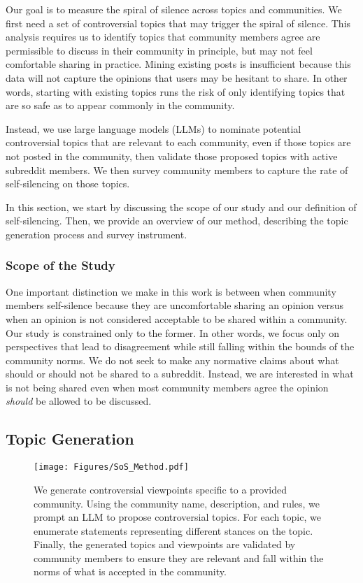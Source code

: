 Our goal is to measure the spiral of silence across topics and communities. We first need a set of controversial topics that may trigger the spiral of silence. This analysis requires us to identify topics that community members agree are permissible to discuss in their community in principle, but may not feel comfortable sharing in practice. Mining existing posts is insufficient because this data will not capture the opinions that users may be hesitant to share. In other words, starting with existing topics runs the risk of only identifying topics that are so safe as to appear commonly in the community. 

Instead, we use large language models (LLMs) to nominate potential controversial topics that are relevant to each community, even if those topics are not posted in the community, then validate those proposed topics with active subreddit members. We then survey community members to capture the rate of self-silencing on those topics. 

In this section, we start by discussing the scope of our study and our definition of self-silencing. Then, we provide an overview of our method, describing the topic generation process and survey instrument.

\subsubsection{Scope of the Study} One important distinction we make in this work is between when community members self-silence because they are uncomfortable sharing an opinion versus when an opinion is not considered acceptable to be shared within a community. Our study is constrained only to the former. In other words, we focus only on perspectives that lead to disagreement while still falling within the bounds of the community norms. We do not seek to make any normative claims about what should or should not be shared to a subreddit. Instead, we are interested in what is not being shared even when most community members agree the opinion \emph{should} be allowed to be discussed. 


\subsection{Topic Generation}
\label{sub:topic-generation}
\begin{figure*}[t]
    \centering
    \texttt{[image: Figures/SoS\_Method.pdf]}
    \caption{We generate controversial viewpoints specific to a provided community. Using the community name, description, and rules, we prompt an LLM to propose controversial topics. For each topic, we enumerate statements representing different stances on the topic. Finally, the generated topics and viewpoints are validated by community members to ensure they are relevant and fall within the norms of what is accepted in the community. }
    \label{fig:generation_method}
\end{figure*}

